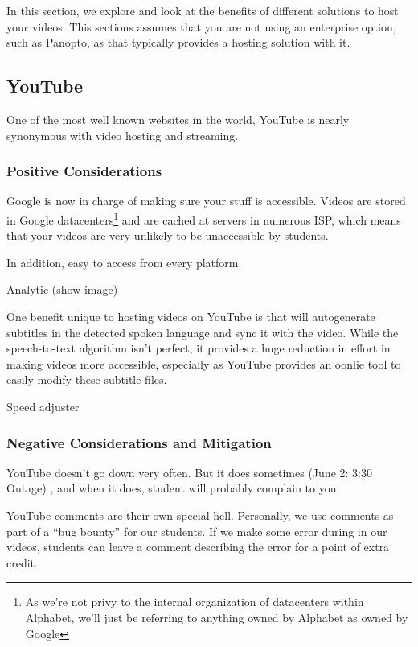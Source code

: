 \documentclass[sigconf]{acmart}
\begin{document}
In this section, we explore and look at the benefits of different solutions to host your videos.  
This sections assumes that you are not using an enterprise option, such as Panopto, as that typically provides a hosting solution with it.

\subsection{YouTube}
One of the most well known websites in the world, YouTube is nearly synonymous with video hosting and streaming.


\subsubsection{Positive Considerations}
Google is now in charge of making sure your stuff is accessible.
Videos are stored in Google datacenters\footnote{As we're not privy to the internal organization of datacenters within Alphabet, we'll just be referring to anything owned by Alphabet as owned by Google} and are cached at servers in numerous ISP, which means that your videos are very unlikely to be unaccessible by students. 

In addition, easy to access from every platform.

Analytic  (show image)


One benefit unique to hosting videos on YouTube is that will autogenerate subtitles in the detected spoken language \cite{liao2013large} and sync it with the video.  While the speech-to-text algorithm isn't perfect, it provides a huge reduction in effort in making videos more accessible, especially as YouTube provides an oonlie tool to easily modify these subtitle files.


Speed adjuster

\subsubsection{Negative Considerations and Mitigation}
YouTube doesn't go down very often.  
But it does sometimes \cite{outage2018} (June 2: 3:30 Outage) \cite{outage2019}, and when it does, student will probably complain to you 

YouTube comments are their own special hell.
Personally, we use comments as part of a ``bug bounty'' for our students.
If we make some error during in our videos, students can leave a comment describing the error for a point of extra credit.
\end{document}
